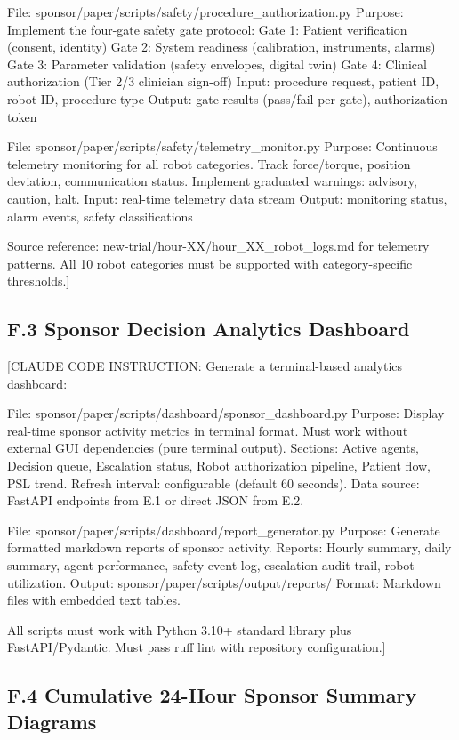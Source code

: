 File: sponsor/paper/scripts/safety/procedure\_authorization.py
Purpose: Implement the four-gate safety gate protocol:
Gate 1: Patient verification (consent, identity)
Gate 2: System readiness (calibration, instruments, alarms)
Gate 3: Parameter validation (safety envelopes, digital twin)
Gate 4: Clinical authorization (Tier 2/3 clinician sign-off)
Input: procedure request, patient ID, robot ID, procedure type
Output: gate results (pass/fail per gate), authorization token

File: sponsor/paper/scripts/safety/telemetry\_monitor.py
Purpose: Continuous telemetry monitoring for all robot categories.
Track force/torque, position deviation, communication status.
Implement graduated warnings: advisory, caution, halt.
Input: real-time telemetry data stream
Output: monitoring status, alarm events, safety classifications

Source reference: new-trial/hour-XX/hour\_XX\_robot\_logs.md for telemetry patterns.
All 10 robot categories must be supported with category-specific thresholds.]

\subsection*{F.3 Sponsor Decision Analytics Dashboard}

[CLAUDE CODE INSTRUCTION: Generate a terminal-based analytics dashboard:

File: sponsor/paper/scripts/dashboard/sponsor\_dashboard.py
Purpose: Display real-time sponsor activity metrics in terminal format.
Must work without external GUI dependencies (pure terminal output).
Sections: Active agents, Decision queue, Escalation status,
Robot authorization pipeline, Patient flow, PSL trend.
Refresh interval: configurable (default 60 seconds).
Data source: FastAPI endpoints from E.1 or direct JSON from E.2.

File: sponsor/paper/scripts/dashboard/report\_generator.py
Purpose: Generate formatted markdown reports of sponsor activity.
Reports: Hourly summary, daily summary, agent performance,
safety event log, escalation audit trail, robot utilization.
Output: sponsor/paper/scripts/output/reports/
Format: Markdown files with embedded text tables.

All scripts must work with Python 3.10+ standard library plus FastAPI/Pydantic.
Must pass ruff lint with repository configuration.]

\subsection*{F.4 Cumulative 24-Hour Sponsor Summary Diagrams}


